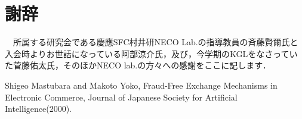 \documentclass[twocolumn, a4j]{article}
\begin{document}
%

\section*{謝辞}
　所属する研究会である慶應SFC村井研NECO Lab.の指導教員の斉藤賢爾氏と入会時よりお世話になっている阿部涼介氏，及び，今学期のKGLをなさっていた菅藤佑太氏，そのほかNECO lab.の方々への感謝をここに記します．

\renewcommand{\refname}{参考文献}
\begin{thebibliography}{数字}
   Shigeo Mastubara and Makoto Yoko, Fraud-Free Exchange Mechanisms in Electronic Commerce, Journal of Japanese Society for Artificial Intelligence(2000).
\end{thebibliography}
\end{document}
